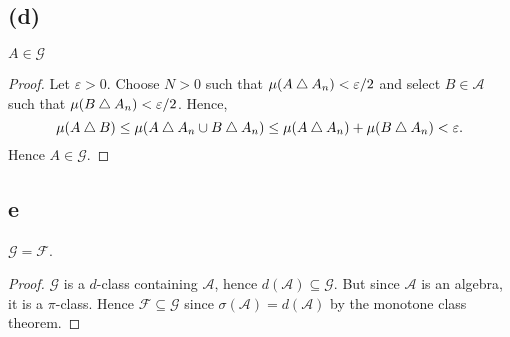 \documentclass{unswmaths}
\begin{document}
\subsection*{(d)}
\begin{corollary}
    $A \in \mathcal{G}$
\end{corollary}
\begin{proof}
    Let $\varepsilon > 0$. Choose $N > 0$ such that $\mu(A \bigtriangleup A_n) < \varepsilon/2$
    and select $B \in \mathcal{A}$ such that $\mu(B \bigtriangleup A_n) < \varepsilon/2$.
    Hence,
    \begin{equation*}
        \mu(A\bigtriangleup B) \leq \mu(A\bigtriangleup A_n \cup B\bigtriangleup A_n) \leq \mu(A\bigtriangleup A_n)+\mu(B\bigtriangleup A_n) < \varepsilon.
    \end{equation*}
    Hence $A \in \mathcal{G}$.
\end{proof}
\subsection*{e}
\begin{theorem}
    $\mathcal{G} = \mathcal{F}$.
\end{theorem}
\begin{proof}
    $\mathcal{G}$ is a $d$-class containing $\mathcal{A}$, hence $d(\mathcal{A}) \subseteq \mathcal{G}$.
    But since $\mathcal{A}$ is an algebra, it is a $\pi$-class. Hence $\mathcal{F} \subseteq \mathcal{G}$
    since $\sigma(\mathcal{A}) = d(\mathcal{A})$ by the monotone class theorem.    
\end{proof}
\end{document}
